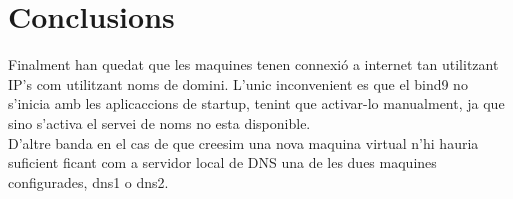 \documentclass[11p]{article}
\begin{document}
\section{Conclusions}
Finalment han quedat que les maquines tenen connexió a internet tan utilitzant IP's com utilitzant noms de domini. L'unic inconvenient es que el bind9 no s'inicia amb les aplicaccions de startup, tenint que activar-lo manualment, ja que sino s'activa el servei de noms no esta disponible.\\
D'altre banda en el cas de que creesim una nova maquina virtual n'hi hauria suficient ficant com a servidor local de DNS una de les dues maquines configurades, dns1 o dns2.
\end{document}

